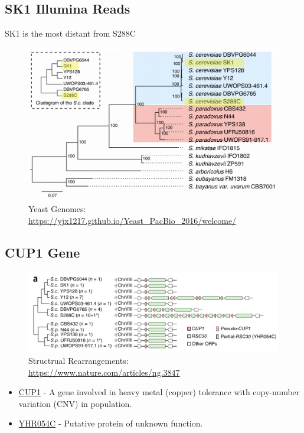 \documentclass[
]{book}
\providecommand{\tightlist}{%
  \setlength{\itemsep}{0pt}\setlength{\parskip}{0pt}}
\begin{document}
\hypertarget{sk1-illumina-reads}{%
\subsection{SK1 Illumina Reads}\label{sk1-illumina-reads}}

SK1 is the most distant from S288C

\begin{figure}
\centering
\includegraphics[width=1\textwidth,height=\textheight]{./Figures/YeastB.png}
\caption{Yeast Genomes: \url{https://yjx1217.github.io/Yeast_PacBio_2016/welcome/}}
\end{figure}

\hypertarget{cup1-gene}{%
\subsection{CUP1 Gene}\label{cup1-gene}}

\begin{figure}
\centering
\includegraphics[width=1\textwidth,height=\textheight]{./Figures/StructuralRearrangements.png}
\caption{Structrual Rearrangements: \url{https://www.nature.com/articles/ng.3847}}
\end{figure}

\begin{itemize}
\tightlist
\item
  \href{https://www.yeastgenome.org/locus/S000001095}{CUP1} - A gene involved in heavy metal (copper) tolerance with copy-number variation (CNV) in population.
\item
  \href{https://www.yeastgenome.org/locus/S000001096}{YHR054C} - Putative protein of unknown function.
\end{itemize}
\end{document}
